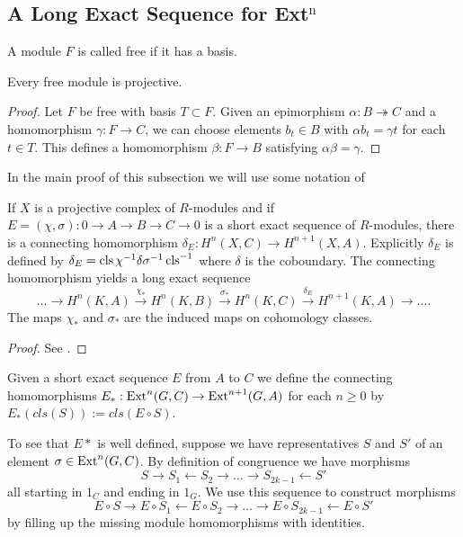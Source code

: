 \subsection{A Long Exact Sequence for Ext$^\text{n}$}
\label{ss:alongexactsequenceforextn}
\begin{definition}
A module $F$ is called free if it has a basis.
\end{definition}
\begin{lemma}
Every free module is projective.
\end{lemma}
\begin{proof}
Let $F$ be free with basis $T \subset F$.
Given an epimorphism $\alpha: B \twoheadrightarrow C$ and a homomorphism $\gamma: F \to C$, we can choose elements $b_t \in B$ with $\alpha b_t = \gamma t$ for each $t\in T$.
This defines a homomorphism $\beta: F \to B$ satisfying $\alpha\beta=\gamma$.
\end{proof}
In the main proof of this subsection we will use some notation of
\begin{theorem}\cite[Theorem II.4.5.]{maclane}
\label{thm:longcohomologysequence}
If $X$ is a projective complex of $R$-modules and if 
$E=(\chi,\sigma): 0 \to A \to B \to C \to 0$
is a short exact sequence of $R$-modules, there is a connecting homomorphism 
$\delta_E:H^n(X,C)\to H^{n+1}(X,A)$.
Explicitly $\delta_E$ is defined by
$\delta_E = \operatorname{cls} \chi^{-1}\delta\sigma^{-1}\operatorname{cls}^{-1}$ where $\delta$ is the coboundary.
The connecting homomorphism yields a long exact sequence
\[
\dots \to
H^n(K,A)\xrightarrow{\chi_*}
H^n(K,B)\xrightarrow{\sigma_*}
H^n(K,C) \xrightarrow{\delta_E}
H^{n+1}(K,A)\to
\dots.
\]
The maps $\chi_*$ and $\sigma_*$ are the induced maps on cohomology classes.
\end{theorem}
\begin{proof}
See \cite[Theorem II.4.5.]{maclane}.
\end{proof}
\begin{definition}
Given a short exact sequence $E$ from $A$ to $C$ we define the connecting homomorphisms
$E_*:\operatorname{Ext}^{n}(G,C) \rightarrow \operatorname{Ext}^{n+1}(G,A)$ for each $n\geq0$ by $E_*(cls(S)) := cls(E\circ S)$.
\end{definition}
To see that $E*$ is well defined, suppose we have representatives $S$ and $S'$ of an element $\sigma\in\operatorname{Ext}^{n}(G,C)$.
By definition of congruence we have morphisms 
\[S \to S_1 \leftarrow S_2 \to \dots \to S_{2k-1} \leftarrow S'\]
all starting in $1_C$ and ending in $1_G$.
We use this sequence to construct morphisms
\[E\circ S \to E\circ S_1 \leftarrow E\circ  S_2 \to \dots \to E\circ  S_{2k-1} \leftarrow E\circ  S'\]
by filling up the missing module homomorphisms with identities.

